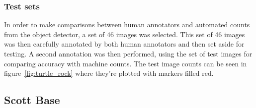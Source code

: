 \subsubsection{Test sets}

In order to make comparisons between human annotators and automated counts from the object detector, a set of 46 images was selected. This set of 46 images was then carefully annotated by both human annotators and then set aside for testing. A second annotation was then performed, using the set of test images for comparing accuracy with machine counts. The test image counts can be seen in figure~\ref{fig:turtle_rock} where they're plotted with markers filled red. 






\subsection{Scott Base \cite{Eisert2019}}

